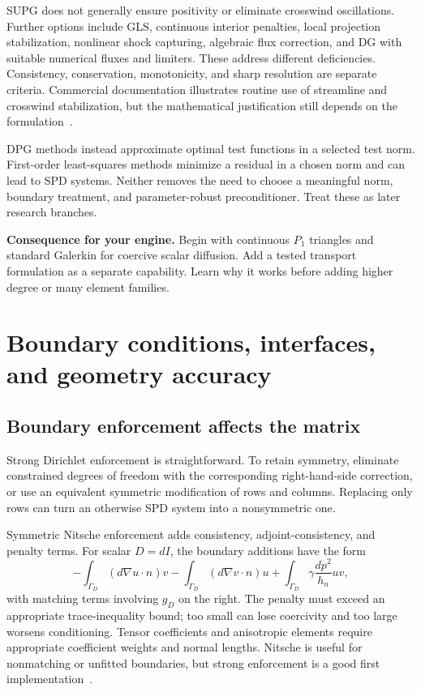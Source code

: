 \documentclass[11pt,a4paper]{article}
\newcommand{\decision}[1]{\par\smallskip\noindent\textcolor{accent}{\textbf{Consequence for your engine.}} #1\par}
\begin{document}
SUPG does not generally ensure positivity or eliminate crosswind oscillations. Further options include GLS, continuous interior penalties, local projection stabilization, nonlinear shock capturing, algebraic flux correction, and DG with suitable numerical fluxes and limiters. These address different deficiencies. Consistency, conservation, monotonicity, and sharp resolution are separate criteria. Commercial documentation illustrates routine use of streamline and crosswind stabilization, but the mathematical justification still depends on the formulation~\cite{comsolstab}.

DPG methods instead approximate optimal test functions in a selected test norm. First-order least-squares methods minimize a residual in a chosen norm and can lead to SPD systems. Neither removes the need to choose a meaningful norm, boundary treatment, and parameter-robust preconditioner. Treat these as later research branches.

\decision{Begin with continuous $P_1$ triangles and standard Galerkin for coercive scalar diffusion. Add a tested transport formulation as a separate capability. Learn why it works before adding higher degree or many element families.}

\section{Boundary conditions, interfaces, and geometry accuracy}\label{sec:bc}
\subsection{Boundary enforcement affects the matrix}
Strong Dirichlet enforcement is straightforward. To retain symmetry, eliminate constrained degrees of freedom with the corresponding right-hand-side correction, or use an equivalent symmetric modification of rows and columns. Replacing only rows can turn an otherwise SPD system into a nonsymmetric one.

Symmetric Nitsche enforcement adds consistency, adjoint-consistency, and penalty terms. For scalar $D=dI$, the boundary additions have the form
\begin{equation}
-\int_{\Gamma_D}(d\nabla u\cdot n)v
-\int_{\Gamma_D}(d\nabla v\cdot n)u
+\int_{\Gamma_D}\gamma\frac{dp^2}{h_n}uv,
\end{equation}
with matching terms involving $g_D$ on the right. The penalty must exceed an appropriate trace-inequality bound; too small can lose coercivity and too large worsens conditioning. Tensor coefficients and anisotropic elements require appropriate coefficient weights and normal lengths. Nitsche is useful for nonmatching or unfitted boundaries, but strong enforcement is a good first implementation~\cite{nitsche}.
\end{document}
